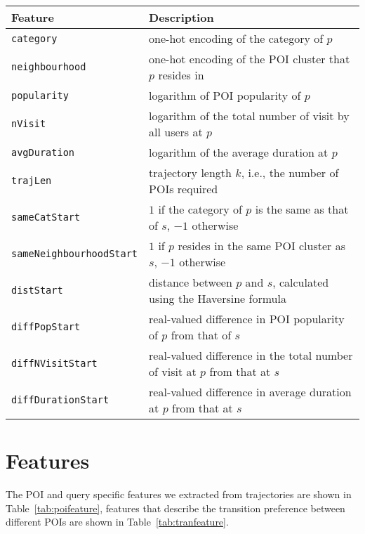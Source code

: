\documentclass[9pt]{extarticle}
\begin{document}
\begin{table*}[ht]
\caption{Features of POI $p$ with respect to query $(s,k)$}
\label{tab:poifeature}
\centering
\setlength{\tabcolsep}{10pt} %
\begin{tabular}{l|l} \hline
\textbf{Feature}  & \textbf{Description} \\ \hline
\texttt{category}               & one-hot encoding of the category of $p$ \\
\texttt{neighbourhood}          & one-hot encoding of the POI cluster that $p$ resides in \\
\texttt{popularity}             & logarithm of POI popularity of $p$ \\
\texttt{nVisit}                 & logarithm of the total number of visit by all users at $p$ \\
\texttt{avgDuration}            & logarithm of the average duration at $p$ \\ \hline
\texttt{trajLen}                & trajectory length $k$, i.e., the number of POIs required \\
\texttt{sameCatStart}           & $1$ if the category of $p$ is the same as that of $s$, $-1$ otherwise \\
\texttt{sameNeighbourhoodStart} & $1$ if $p$ resides in the same POI cluster as $s$, $-1$ otherwise \\
\texttt{distStart}              & distance between $p$ and $s$, calculated using the Haversine formula \\
\texttt{diffPopStart}           & real-valued difference in POI popularity of $p$ from that of $s$ \\
\texttt{diffNVisitStart}        & real-valued difference in the total number of visit at $p$ from that at $s$ \\
\texttt{diffDurationStart}      & real-valued difference in average duration at $p$ from that at $s$ \\
\hline
\end{tabular}
\end{table*}


\section{Features}
\label{sec:feature}

The POI and query specific features we extracted from trajectories are shown in Table~\ref{tab:poifeature},
features that describe the transition preference between different POIs are shown in Table~\ref{tab:tranfeature}.
\end{document}
